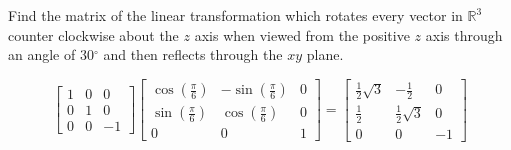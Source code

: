 \documentclass{ximera}
\begin{document}
\begin{problem}\label{prb:6.25} Find the matrix of the linear transformation which rotates every
vector in $\mathbb{R}^{3}$ counter clockwise about the $z$ axis when viewed
from the positive $z$ axis through an angle of 30$^{\circ }$ and then
reflects through the $xy$ plane.
\begin{hint}
\[
\left[
\begin{array}{rrr}
1 & 0 & 0 \\
0 & 1 & 0 \\
0 & 0 & -1
\end{array}
\right] \left[
\begin{array}{ccc}
\cos \left( \frac{\pi }{6}\right)  & -\sin \left( \frac{\pi }{6}\right)  & 0
\\
\sin \left( \frac{\pi }{6}\right)  & \cos \left( \frac{\pi }{6}\right)  & 0
\\
0 & 0 & 1
\end{array}
\right] = \left[
\begin{array}{ccc}
\frac{1}{2}\sqrt{3} & -\frac{1}{2} & 0 \\
\frac{1}{2} & \frac{1}{2}\sqrt{3} & 0 \\
0 & 0 & -1
\end{array}
\right]
\]
\end{hint}
\end{problem}
\end{document}
